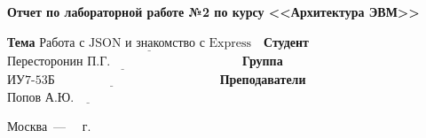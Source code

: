 \documentclass[a4paper,14pt, unknownkeysallowed]{extreport}
\begin{document}
\begin{titlepage}
\begin{center}
    \Large\textbf{Отчет по лабораторной работе №2 по курсу <<Архитектура ЭВМ>>}
\end{center}

\noindent\textbf{Тема} $\underline{\text{Работа с JSON и знакомство с Express~~}}$\newline\newline
\noindent\textbf{Студент} $\underline{\text{Пересторонин П.Г.~~~~~~~~~~~~~~~~~~~~~~~~~~~~~~~}}$\newline\newline
\noindent\textbf{Группа} $\underline{\text{ИУ7-53Б~~~~~~~~~~~~~~~~~~~~~~~~~~~~~~~~~~~~~~~}}$\newline\newline
\noindent\textbf{Преподаватели} $\underline{\text{Попов А.Ю.~~~~~~~~~~~~~~~~~~~~~~~}}$\newline

\begin{center}
    \vfill
    Москва~---~\the\year
    ~г.
\end{center}
\restoregeometry
\end{titlepage}
\end{document}

